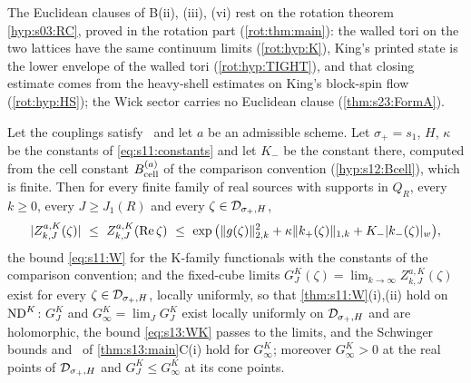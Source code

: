 \begin{remark}\label{rem:s13:rotation}
The Euclidean clauses of B(ii), (iii), (vi) rest on the rotation theorem \cref{hyp:s03:RC}, proved in the rotation part (\cref{rot:thm:main}): the walled tori on the two lattices have the same continuum limits (\cref{rot:hyp:K}), King's printed state is the lower envelope of the walled tori (\cref{rot:hyp:TIGHT}), and that closing estimate comes from the heavy-shell estimates on King's block-spin flow (\cref{rot:hyp:HS}); the Wick sector carries no Euclidean clause (\cref{thm:s23:FormA}).
\end{remark}

\begin{theorem}\label{thm:s13:TWK}
Let the couplings satisfy \Tthree\ and let $a$ be an admissible scheme. Let $\sigma_+=s_1$, $H$, $\kappa$ be the constants of \eqref{eq:s11:constants} and let $K_-$ be the constant there, computed from the cell constant $B^{(a)}_{\rm cell}$ of the comparison convention (\cref{hyp:s12:Bcell}), which is finite. Then for every finite family of real sources with supports in $Q_R$, every $k\ge0$, every $J\ge J_1(R)$ and every $\zeta\in\mathcal D_{\sigma_+,H}$,
\begin{equation}\label{eq:s13:WK}
|Z^{a,K}_{k,J}(\zeta)|\ \le\ Z^{a,K}_{k,J}(\Re\zeta)\ \le\ \exp\big(\norm{g(\zeta)}_{2,k}^2+\kappa\norm{k_+(\zeta)}_{1,k}+K_-\wnorm{k_-(\zeta)}\big),
\end{equation}
the bound \eqref{eq:s11:W} for the K-family functionals with the constants of the comparison convention; and the fixed-cube limits $G^K_J(\zeta)=\lim_{k\to\infty}Z^{a,K}_{k,J}(\zeta)$ exist for every $\zeta\in\mathcal D_{\sigma_+,H}$, locally uniformly, so that \cref{thm:s11:W}(i),(ii) hold on $\mathrm{ND}^{K}$: $G^K_J$ and $G^K_\infty=\lim_JG^K_J$ exist locally uniformly on $\mathcal D_{\sigma_+,H}$ and are holomorphic, the bound \eqref{eq:s13:WK} passes to the limits, and the Schwinger bounds and \Ezz\ of \cref{thm:s13:main}C(i) hold for $G^K_\infty$; moreover $G^K_\infty>0$ at the real points of $\mathcal D_{\sigma_+,H}$ and $G^K_J\le G^K_\infty$ at its cone points.
\end{theorem}



